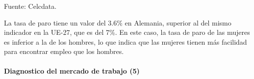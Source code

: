     \begin{table}[htbp]
      \centering
      \begin{center}
      \end{center}
      \label{tab:addlabel}%
      \begin{center}
      \tiny Fuente: Celcdata.
      \end{center}
    \end{table}
    La tasa de paro tiene un valor del 3.6\% en Alemania, superior al del mismo indicador en la UE-27, que es del 7\%. En este caso, la tasa de paro de las mujeres es inferior a la de los hombres, lo que indica que las mujeres tienen más facilidad para encontrar empleo que los hombres.\\\\


    \textbf{Diagnostico del mercado de trabajo (5)}
